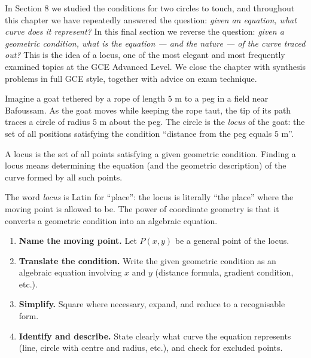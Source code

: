 \documentclass[11pt]{article}
\newcommand{\cle}[1]{{\popxbold\color{popdark}#1}}
\newcounter{popsec}
\newcounter{popsub}
\newcommand{\courssub}[1]{%
  \stepcounter{popsub}%
  \par\vspace{9pt}\noindent{\popxbold\fontsize{11.5}{13}\selectfont\color{popink}{\color{poporange}\thepopsec.\thepopsub}\hspace{6pt}#1}\par\nopagebreak\vspace{4pt}
}
\begin{document}
In Section 8 we studied the conditions for two circles to touch, and throughout this chapter we have repeatedly answered the question: \emph{given an equation, what curve does it represent?} In this final section we reverse the question: \emph{given a geometric condition, what is the equation — and the nature — of the curve traced out?} This is the idea of a \cle{locus}, one of the most elegant and most frequently examined topics at the GCE Advanced Level. We close the chapter with synthesis problems in full GCE style, together with advice on exam technique.

\courssub{The Concept of a Locus}

Imagine a goat tethered by a rope of length $5$ m to a peg in a field near Bafoussam. As the goat moves while keeping the rope taut, the tip of its path traces a circle of radius $5$ m about the peg. The circle is the \emph{locus} of the goat: the set of all positions satisfying the condition ``distance from the peg equals $5$ m''.

\begin{definition}[Locus]
A \cle{locus} is the set of all points satisfying a given geometric condition. Finding a locus means determining the equation (and the geometric description) of the curve formed by all such points.
\end{definition}

The word \emph{locus} is Latin for ``place'': the locus is literally ``the place'' where the moving point is allowed to be. The power of coordinate geometry is that it converts a geometric condition into an algebraic equation.

\begin{methode}
\begin{enumerate}
\item \textbf{Name the moving point.} Let $P(x, y)$ be a general point of the locus.
\item \textbf{Translate the condition.} Write the given geometric condition as an algebraic equation involving $x$ and $y$ (distance formula, gradient condition, etc.).
\item \textbf{Simplify.} Square where necessary, expand, and reduce to a recognisable form.
\item \textbf{Identify and describe.} State clearly what curve the equation represents (line, circle with centre and radius, etc.), and check for excluded points.
\end{enumerate}
\end{methode}
\end{document}
